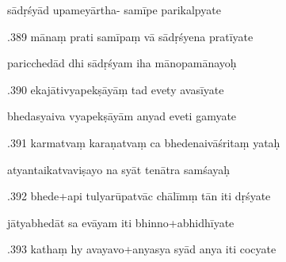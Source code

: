 \documentclass[article,12pt,a4paper]{memoir}%
\newcounter{parCount}
\begin{document}
	  
	  \pstart \leavevmode%
	sādṛśyād upameyārtha- samīpe parikalpyate 
	{}
	\pend%
      

	  
	  \pstart {}.389 mānaṃ prati samīpaṃ vā sādṛśyena pratīyate 
	{}
	\pend%
      

	  
	  \pstart \leavevmode%
	paricchedād dhi sādṛśyam iha mānopamānayoḥ 
	{}
	\pend%
      

	  
	  \pstart {}.390 ekajātivyapekṣāyāṃ tad evety avasīyate 
	{}
	\pend%
      

	  
	  \pstart \leavevmode%
	bhedasyaiva vyapekṣāyām anyad eveti gamyate 
	{}
	\pend%
      

	  
	  \pstart {}.391 karmatvaṃ karaṇatvaṃ ca bhedenaivāśritaṃ yataḥ 
	{}
	\pend%
      

	  
	  \pstart \leavevmode%
	atyantaikatvaviṣayo na syāt tenātra samśayaḥ 
	{}
	\pend%
      

	  
	  \pstart {}.392 bhede+api tulyarūpatvāc chālīmṃ tān iti dṛśyate 
	{}
	\pend%
      

	  
	  \pstart \leavevmode%
	jātyabhedāt sa evāyam iti bhinno+abhidhīyate 
	{}
	\pend%
      

	  
	  \pstart {}.393 kathaṃ hy avayavo+anyasya syād anya iti cocyate 
	{}
	\pend%
      
\end{document}
